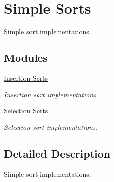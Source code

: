 \hypertarget{group__SimpleSort}{}\section{Simple Sorts}
\label{group__SimpleSort}


Simple sort implementations.  


\subsection*{Modules}
\begin{DoxyCompactItemize}
\item 
\hyperlink{group__InsertionSort}{Insertion Sorts}
\begin{DoxyCompactList}\small\item\em Insertion sort implementations. \end{DoxyCompactList}\item 
\hyperlink{group__SelectionSort}{Selection Sorts}
\begin{DoxyCompactList}\small\item\em Selection sort implementations. \end{DoxyCompactList}\end{DoxyCompactItemize}


\subsection{Detailed Description}
Simple sort implementations. 

